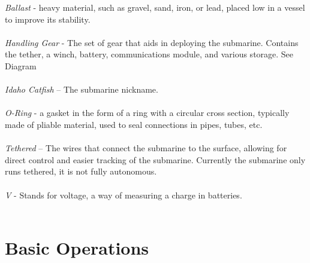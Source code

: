 \documentclass[
18pt, %
a4paper, %
oneside, %
headinclude,footinclude, %
]{scrartcl}
\begin{document}
\textit{Ballast} - heavy material, such as gravel, sand, iron, or lead, placed low in a vessel to improve its stability. \\ \\
\textit{Handling Gear} - The set of gear that aids in deploying the submarine. Contains the tether, a winch, battery, communications module, and various storage. See Diagram \\ \\
\textit{Idaho Catfish }  – The submarine nickname. \\ \\
\textit{O-Ring} - a gasket in the form of a ring with a circular cross section, typically made of pliable material, used to seal connections in pipes, tubes, etc. \\ \\
\textit{Tethered } – The wires that connect the submarine to the surface, allowing for direct control and easier tracking of the submarine. Currently the submarine only runs tethered, it is not fully autonomous. \\ \\
\textit{ V } - Stands for voltage, a way of measuring a charge in batteries. \\ \\

\newpage
 

\section{Basic Operations}
\end{document}
